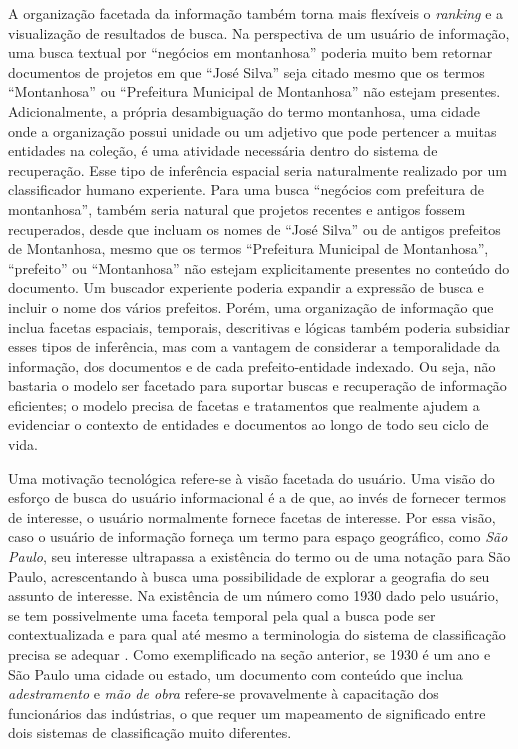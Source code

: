A organização facetada da informação também torna mais flexíveis o \textit{ranking} e a visualização de resultados de busca. Na perspectiva de um usuário de informação, uma busca textual por ``negócios em montanhosa'' poderia muito bem retornar documentos de projetos em que ``José Silva'' seja citado mesmo que os termos ``Montanhosa'' ou ``Prefeitura Municipal de Montanhosa'' não estejam presentes. Adicionalmente, a própria desambiguação do termo montanhosa, uma cidade onde a organização possui unidade ou um adjetivo que pode pertencer a muitas entidades na coleção, é uma atividade necessária dentro do sistema de recuperação. Esse tipo de inferência espacial seria naturalmente realizado por um classificador humano experiente. Para uma busca ``negócios com prefeitura de montanhosa'', também seria natural que projetos recentes e antigos fossem recuperados, desde que incluam os nomes de ``José Silva'' ou de antigos prefeitos de Montanhosa, mesmo que os termos ``Prefeitura Municipal de Montanhosa'', ``prefeito'' ou ``Montanhosa'' não estejam explicitamente presentes no conteúdo do documento. Um buscador experiente poderia expandir a expressão de busca e incluir o nome dos vários prefeitos. Porém, uma organização de informação que inclua facetas espaciais, temporais, descritivas e lógicas também poderia subsidiar esses tipos de inferência, mas com a vantagem de considerar a temporalidade da informação, dos documentos e de cada prefeito-entidade indexado. Ou seja, não bastaria o modelo ser facetado para suportar buscas e recuperação de informação eficientes; o modelo precisa de facetas e tratamentos que realmente ajudem a evidenciar o contexto de entidades e documentos ao longo de todo seu ciclo de vida.






Uma motivação tecnológica refere-se à visão facetada do usuário. Uma visão do esforço de busca do usuário informacional é a de que, ao invés de fornecer termos de interesse, o usuário normalmente fornece facetas de interesse. Por essa visão, caso o usuário de informação forneça um termo para espaço geográfico, como \emph{São Paulo}, seu interesse ultrapassa a existência do termo ou de uma notação para São Paulo, acrescentando à busca uma possibilidade de explorar a geografia do seu assunto de interesse. Na existência de um número como 1930 dado pelo usuário, se tem possivelmente uma faceta temporal pela qual a busca pode ser contextualizada e para qual até mesmo a terminologia do sistema de classificação precisa se adequar \cite{hong06,borges07,mir2ed}. Como exemplificado na seção anterior, se 1930 é um ano e São Paulo uma cidade ou estado, um documento com conteúdo que inclua \emph{adestramento} e \emph{mão de obra} refere-se provavelmente à capacitação dos funcionários das indústrias, o que requer um mapeamento de significado entre dois sistemas de classificação muito diferentes. 

